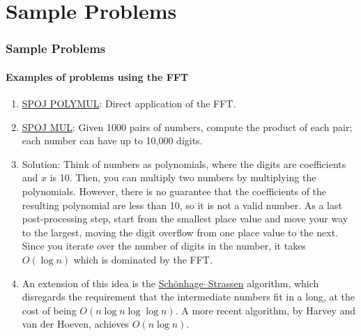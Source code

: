 \documentclass{beamer}                             %
\begin{document}
\section{Sample Problems}
\begin{frame}
\frametitle{Sample Problems}
\framesubtitle{Examples of problems using the FFT}
\begin{enumerate}
  \item \href{https://www.spoj.com/problems/POLYMUL/}{SPOJ POLYMUL}:
    Direct application of the FFT.

  \item \href{https://www.spoj.com/problems/MUL/}{SPOJ MUL}:
    Given 1000 pairs of numbers, compute the product of each pair;
    each number can have up to 10,000 digits.
    \addtocounter{enumi}{-1}
  \item Solution: Think of numbers as polynomials,
    where the digits are coefficients and \( x \) is 10.
    Then, you can multiply two numbers by multiplying the polynomials.
    However, there is no guarantee that the coefficients
    of the resulting polynomial are less than 10, so it is not a valid number.
    As a last post-processing step, start from the smallest place value
    and move your way to the largest, moving the digit overflow from one place
    value to the next. Since you iterate over the number of digits in the
    number, it takes \( O(\log n) \) which is dominated by the FFT.  
    \addtocounter{enumi}{-1}
  \item An extension of this idea is the 
    \href{https://en.wikipedia.org/wiki/Sch\%C3\%B6nhage\%E2\%80\%93Strassen_algorithm}
    {Schönhage–Strassen} algorithm, which disregards the requirement
    that the intermediate numbers fit in a long, at the cost of being
    \( O(n \log n \log \log n) \). A more recent algorithm,
    by Harvey and van der Hoeven, achieves 
    \href{https://hal.archives-ouvertes.fr/hal-02070778/document}{\( O(n \log n) \)}.


\end{enumerate}
\end{frame}
\end{document}
